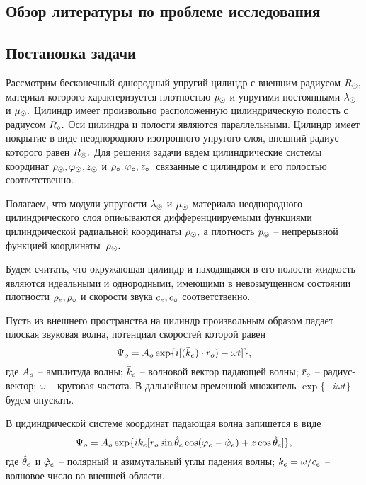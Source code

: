 \newpage
\subsection{Обзор литературы по проблеме исследования}

\newpage
\subsection{Постановка задачи} 

Рассмотрим бесконечный однородный упругий цилиндр с внешним радиусом $R_\odot,$ материал которого характеризуется плотностью $p_\odot$ и упругими постоянными $\lambda_\odot$ и $\mu_\odot.$ Цилиндр имеет произвольно расположенную цилиндрическую полость с радиусом $R_\circ.$ Оси цилиндра и полости являются параллельными. Цилиндр имеет покрытие в виде неоднородного изотропного упругого слоя, внешний радиус которого равен $R_\circledcirc.$ Для решения задачи ввдем цилиндрические системы координат $\rho_\odot, \varphi_\odot, z_\odot$ и $\rho_\circ, \varphi_\circ, z_\circ,$ связанные с цилиндром и его полостью соответственно.

Полагаем, что модули упругости $\lambda_\circledcirc$ и $\mu_\circledcirc$ материала неоднородного цилиндрического слоя опиcываются дифференциируемыми функциями цилиндрической радиальной координаты $\rho_\odot,$ а плотность $p_\circledcirc$ -- непрерывной функцией координаты~$\rho_\odot.$ 

Будем считать, что окружающая цилиндр и находящаяся в его полости жидкость являются идеальными и однородными, имеющими в невозмущенном состоянии плотности $\rho_e, \rho_\circ$ и скорости звука $c_e, c_\circ$ соответственно.

Пусть из внешнего пространства на цилиндр произвольным образом падает плоская звуковая волна, потенциал скоростей которой равен
$$\Psi_o=A_o \exp\{i[(\bar{k}_e)\cdot \bar{r}_o)-\omega t]\},$$
где $A_o$ -- амплитуда волны; $\bar{k}_e$ -- волновой вектор падающей волны; $\bar{r}_o$ -- радиус-вектор; $\omega$ -- круговая частота. В дальнейшем временной множитель $\exp\{-i\omega t\}$ будем опускать.

В цидиндрической системе координат падающая волна запишется в виде
$$\Psi_o=A_o\exp\{ik_e[r_o\sin{\hat{\theta}_e}\cos(\varphi_e-\hat{\varphi}_e)+z\cos\hat{\theta}_e]\},$$
где $\hat{\theta}_e$ и $\hat{\varphi}_e$ -- полярный и азимутальный углы падения волны; $k_e=\omega / c_e$ -- волновое число во внешней области.

